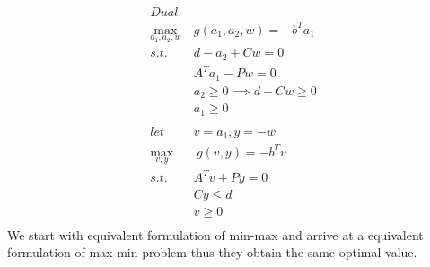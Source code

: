 \documentclass[12pt,letter]{article}
\begin{document}
\begin{enumerate}
\begin{enumerate}
\begin{align*}
      Dual:&\\
      \max_{a_1,a_2,w}\ & g(a_1,a_2,w) = -b^Ta_1\\
      s.t.\ & d-a_2+Cw=0\\
                      &A^Ta_1-Pw=0\\
                      &a_2 \geq 0 \implies d+Cw \geq 0\\
                      &a_1 \geq 0\\
      \\
      let\ &v = a_1, y = -w\\
      \max_{v,y}&\ g(v,y) = -b^Tv\\
      s.t.\ &A^Tv+Py=0\\
                      &Cy \leq d\\
                      &v \geq 0\\
    \end{align*}
    We start with equivalent formulation of min-max and arrive at a equivalent formulation of max-min problem thus they obtain the same optimal value.
  \end{enumerate}
  \pagebreak
  

\end{enumerate}
\end{document}
